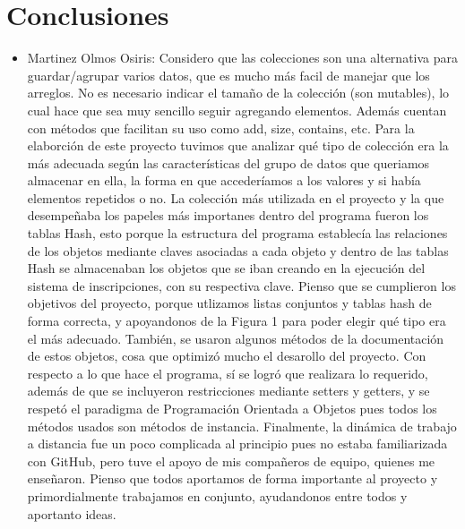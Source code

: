 \documentclass[12pt, letterpaper]{report}
\begin{document}
\newpage
\section*{Conclusiones}

\begin{itemize}
  \item Martinez Olmos Osiris: Considero que las colecciones son una alternativa para guardar/agrupar varios datos, que es mucho más facil de manejar que los arreglos. No es necesario indicar el tamaño de la colección (son mutables), lo cual hace que sea muy sencillo seguir agregando elementos. Además cuentan con métodos que facilitan su uso como add, size, contains, etc. Para la elaborción de este proyecto tuvimos que analizar qué tipo de colección era la más adecuada según las características del grupo de datos que queriamos almacenar en ella, la forma en que accederíamos a los valores y si había elementos repetidos o no. La colección más utilizada en el proyecto y la que desempeñaba los papeles más importanes dentro del programa fueron los tablas Hash, esto porque la estructura del programa establecía las relaciones de los objetos mediante claves asociadas a cada objeto y dentro de las tablas Hash se almacenaban los objetos que se iban creando en la ejecución del sistema de inscripciones, con su respectiva clave. Pienso que se cumplieron los objetivos del proyecto, porque utlizamos listas conjuntos y tablas hash de forma correcta, y apoyandonos de la Figura 1 para poder elegir qué tipo era el más adecuado. También, se usaron algunos métodos de la documentación de estos objetos, cosa que optimizó mucho el desarollo del proyecto. Con respecto a lo que hace el programa, sí se logró que realizara lo requerido, además de que se incluyeron restricciones mediante setters y getters, y se respetó el paradigma de Programación Orientada a Objetos pues todos los métodos usados son métodos de instancia. Finalmente, la dinámica de trabajo a distancia fue un poco complicada al principio pues no estaba familiarizada con GitHub, pero tuve el apoyo de mis compañeros de equipo, quienes me enseñaron. Pienso que todos aportamos de forma importante al proyecto y primordialmente trabajamos en conjunto, ayudandonos entre todos y aportanto ideas. 
  

\end{itemize}
\end{document}
